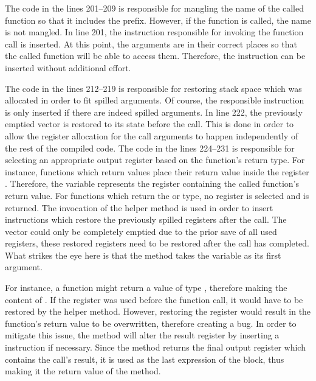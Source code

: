 
The code in the lines 201--209 is responsible for mangling the name of the called function so that it includes the  prefix.
However, if the  function is called, the name is not mangled.
In line 201, the  instruction responsible for invoking the function call is inserted.
At this point, the arguments are in their correct places so that the called function will be able to access them.
Therefore, the instruction can be inserted without additional effort.

The code in the lines 212--219 is responsible for restoring stack space which was allocated in order to fit spilled arguments.
Of course, the responsible  instruction is only inserted if there are indeed spilled arguments.
In line 222, the previously emptied  vector is restored to its state before the call.
This is done in order to allow the register allocation for the call arguments to happen independently of the rest of the compiled code.
The code in the lines 224--231 is responsible for selecting an appropriate output register based on the function's return type.
For instance, functions which return  values place their return value inside the register .
Therefore, the variable  represents the register containing the called function's return value.
For functions which return the \qVerb{()} or \qVerb{!} type, no register is selected and  is returned.
The invocation of the helper method  is used in order to insert instructions which restore the previously spilled registers after the call.
The  vector could only be completely emptied due to the prior save of all used registers, these restored registers need to be restored after the call has completed.
What strikes the eye here is that the method takes the  variable as its first argument.

For instance, a function might return a value of type , therefore making  the content of .
If the register  was used before the function call, it would have to be restored by the helper method.
However, restoring the register would result in the function's return value to be overwritten, therefore creating a bug.
In order to mitigate this issue, the method will alter the result register by inserting a  instruction if necessary.
Since the method returns the final output register which contains the call's result, it is used as the last expression of the block, thus making it the return value of the  method.

